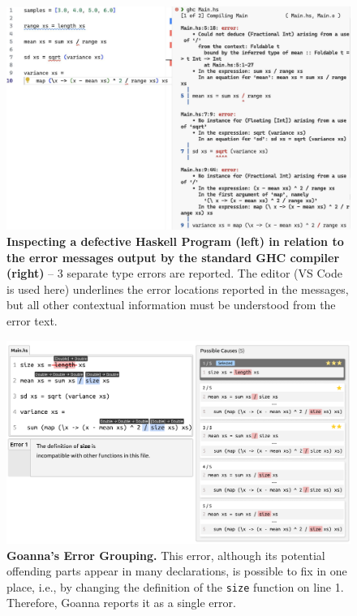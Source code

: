\documentclass[pdflatex,lineno,sn-nature,Numbered]{sn-jnl}%
\begin{document}
    \begin{figure}[ht]
        \centering
        \includegraphics[width=\linewidth]{images/variance-ghc2}
        \caption[Inspecting a defective Haskell Program in relation to the error messages output by the standard GHC compiler]{\textbf{Inspecting a defective Haskell Program (left) in relation to the error messages output by the standard GHC compiler (right)} -- 3 separate type errors are reported.  The editor (VS Code is used here) underlines the error locations reported in the messages, but all other contextual information must be understood from the error text.}
        \label{fig:grouping-ghc}
    \end{figure}
    
        \begin{figure}[ht!]
        \centering
        \includegraphics[width=\linewidth]{images/Goanna-Error-Grouping.pdf}
        \caption[Goanna's Error Grouping]{\textbf{Goanna's Error Grouping.} This error, although its potential offending parts appear in many declarations, is possible to fix in one place, i.e., by changing the definition of the \texttt{size} function on line 1. Therefore, Goanna reports it as a single error.}
        \label{fig:grouping-goanna}
    \end{figure}
\end{document}
